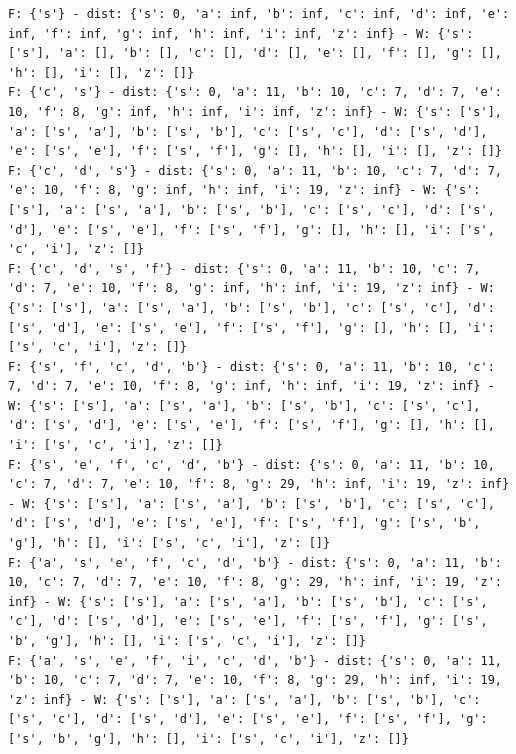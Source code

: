\documentclass[a4paper,11pt]{report}
\begin{document}
    \begin{verbatim}
F: {'s'} - dist: {'s': 0, 'a': inf, 'b': inf, 'c': inf, 'd': inf, 'e': inf, 'f': inf, 'g': inf, 'h': inf, 'i': inf, 'z': inf} - W: {'s': ['s'], 'a': [], 'b': [], 'c': [], 'd': [], 'e': [], 'f': [], 'g': [], 'h': [], 'i': [], 'z': []}
F: {'c', 's'} - dist: {'s': 0, 'a': 11, 'b': 10, 'c': 7, 'd': 7, 'e': 10, 'f': 8, 'g': inf, 'h': inf, 'i': inf, 'z': inf} - W: {'s': ['s'], 'a': ['s', 'a'], 'b': ['s', 'b'], 'c': ['s', 'c'], 'd': ['s', 'd'], 'e': ['s', 'e'], 'f': ['s', 'f'], 'g': [], 'h': [], 'i': [], 'z': []}
F: {'c', 'd', 's'} - dist: {'s': 0, 'a': 11, 'b': 10, 'c': 7, 'd': 7, 'e': 10, 'f': 8, 'g': inf, 'h': inf, 'i': 19, 'z': inf} - W: {'s': ['s'], 'a': ['s', 'a'], 'b': ['s', 'b'], 'c': ['s', 'c'], 'd': ['s', 'd'], 'e': ['s', 'e'], 'f': ['s', 'f'], 'g': [], 'h': [], 'i': ['s', 'c', 'i'], 'z': []}
F: {'c', 'd', 's', 'f'} - dist: {'s': 0, 'a': 11, 'b': 10, 'c': 7, 'd': 7, 'e': 10, 'f': 8, 'g': inf, 'h': inf, 'i': 19, 'z': inf} - W: {'s': ['s'], 'a': ['s', 'a'], 'b': ['s', 'b'], 'c': ['s', 'c'], 'd': ['s', 'd'], 'e': ['s', 'e'], 'f': ['s', 'f'], 'g': [], 'h': [], 'i': ['s', 'c', 'i'], 'z': []}
F: {'s', 'f', 'c', 'd', 'b'} - dist: {'s': 0, 'a': 11, 'b': 10, 'c': 7, 'd': 7, 'e': 10, 'f': 8, 'g': inf, 'h': inf, 'i': 19, 'z': inf} - W: {'s': ['s'], 'a': ['s', 'a'], 'b': ['s', 'b'], 'c': ['s', 'c'], 'd': ['s', 'd'], 'e': ['s', 'e'], 'f': ['s', 'f'], 'g': [], 'h': [], 'i': ['s', 'c', 'i'], 'z': []}
F: {'s', 'e', 'f', 'c', 'd', 'b'} - dist: {'s': 0, 'a': 11, 'b': 10, 'c': 7, 'd': 7, 'e': 10, 'f': 8, 'g': 29, 'h': inf, 'i': 19, 'z': inf} - W: {'s': ['s'], 'a': ['s', 'a'], 'b': ['s', 'b'], 'c': ['s', 'c'], 'd': ['s', 'd'], 'e': ['s', 'e'], 'f': ['s', 'f'], 'g': ['s', 'b', 'g'], 'h': [], 'i': ['s', 'c', 'i'], 'z': []}
F: {'a', 's', 'e', 'f', 'c', 'd', 'b'} - dist: {'s': 0, 'a': 11, 'b': 10, 'c': 7, 'd': 7, 'e': 10, 'f': 8, 'g': 29, 'h': inf, 'i': 19, 'z': inf} - W: {'s': ['s'], 'a': ['s', 'a'], 'b': ['s', 'b'], 'c': ['s', 'c'], 'd': ['s', 'd'], 'e': ['s', 'e'], 'f': ['s', 'f'], 'g': ['s', 'b', 'g'], 'h': [], 'i': ['s', 'c', 'i'], 'z': []}
F: {'a', 's', 'e', 'f', 'i', 'c', 'd', 'b'} - dist: {'s': 0, 'a': 11, 'b': 10, 'c': 7, 'd': 7, 'e': 10, 'f': 8, 'g': 29, 'h': inf, 'i': 19, 'z': inf} - W: {'s': ['s'], 'a': ['s', 'a'], 'b': ['s', 'b'], 'c': ['s', 'c'], 'd': ['s', 'd'], 'e': ['s', 'e'], 'f': ['s', 'f'], 'g': ['s', 'b', 'g'], 'h': [], 'i': ['s', 'c', 'i'], 'z': []}

\end{verbatim}
\end{document}
